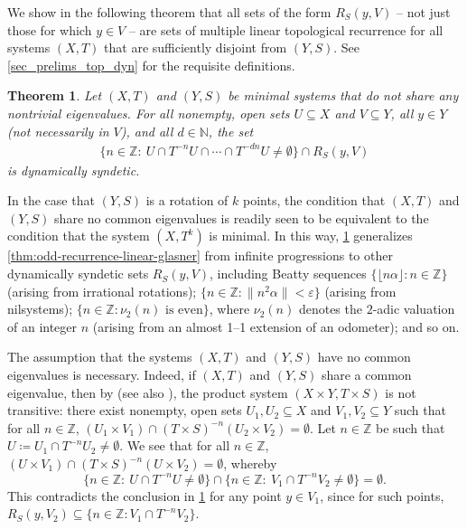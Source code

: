 \documentclass{article}
\theoremstyle{plain}
\theoremstyle{claim}
\theoremstyle{definition}
\theoremstyle{plain}
\newcounter{MainTheoremCounter}
\newtheorem{Maintheorem}[MainTheoremCounter]{Theorem}
\theoremstyle{plain}
\newcommand{\N}{\mathbb{N}}
\newcommand{\Z}{\mathbb{Z}}
\renewcommand{\epsilon}{\varepsilon}
\newcommand{\1}{\boldsymbol{1}}
\newcommand{\defeq}{\coloneqq}
\begin{document}
We show in the following theorem that all sets of the form $R_S(y,V)$ -- not just those for which $y \in V$ -- are sets of multiple linear topological recurrence for all systems $(X,T)$ that are sufficiently disjoint from $(Y,S)$. See \cref{sec_prelims_top_dyn} for the requisite definitions.

\begin{Maintheorem}
\label{Mainthm:odd-recurrence-pol}
Let $(X, T)$ and $(Y, S)$ be minimal systems that do not share any nontrivial eigenvalues.
For all nonempty, open sets $U \subseteq X$ and $V \subseteq Y$, all $y \in Y$ (not necessarily in $V$), and all $d \in \N$, the set
\begin{align}
\label{eqn_set_to_show_dcs}
    \big\{ n \in \Z: \ U \cap T^{-n} U \cap \cdots \cap T^{-dn} U \neq \emptyset \big\} \cap R_S(y,V)
\end{align}
is dynamically syndetic.
\end{Maintheorem}


In the case that $(Y,S)$ is a rotation of $k$ points, the condition that $(X,T)$ and $(Y,S)$ share no common eigenvalues is readily seen to be equivalent to the condition that the system $(X,T^k)$ is minimal. 
In this way, \cref{Mainthm:odd-recurrence-pol} generalizes \cref{thm:odd-recurrence-linear-glasner} from infinite progressions to other dynamically syndetic sets $R_S(y, V)$, including Beatty sequences $\{\lfloor n \alpha \rfloor: n \in \Z\}$ (arising from irrational rotations); $\{n \in \Z : \| n^2 \alpha \| < \epsilon \}$ (arising from nilsystems);  $\{n \in \Z : \nu_2(n) \text{ is even}\}$, where $\nu_2(n)$ denotes the $2$-adic valuation of an integer $n$ (arising from an almost 1--1 extension of an odometer); and so on.


The assumption that the systems $(X,T)$ and $(Y,S)$ have no common eigenvalues is necessary. 
Indeed, if $(X,T)$ and $(Y,S)$ share a common eigenvalue, then by \cite[Theorem 5]{Peleg72} (see also \cite{MR467704}), the product system $(X \times Y, T \times S)$ is not transitive: there exist nonempty, open sets $U_1, U_2 \subseteq X$ and $V_1, V_2 \subseteq Y$ such that for all $n \in \Z$, $(U_1 \times V_1) \cap (T \times S)^{-n} (U_2 \times V_2) = \emptyset$.  Let $n \in \Z$ be such that $U \defeq U_1 \cap T^{-n} U_2 \neq \emptyset$.  We see that for all $n \in \Z$, $(U \times V_1) \cap (T \times S)^{-n} (U \times V_2) = \emptyset$, whereby
\[\big\{ n \in \Z: \ U \cap T^{-n} U \neq \emptyset \big\} \cap \big\{ n \in \Z: \ V_1 \cap T^{-n} V_2 \neq \emptyset \big\} = \emptyset.\]
This contradicts the conclusion in \cref{Mainthm:odd-recurrence-pol} for any point $y \in V_1$, since for such points, $R_S(y,V_2) \subseteq \{n \in \Z : V_1 \cap T^{-n} V_2\}$.
\end{document}

